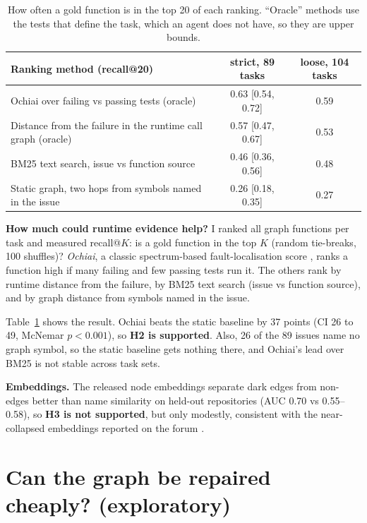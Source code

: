 \documentclass[11pt]{article}
\begin{document}
\begin{table}[t]
\centering\small
\begin{tabular}{lcc}
\toprule
Ranking method (recall@20) & strict, 89 tasks & loose, 104 tasks \\
\midrule
Ochiai over failing vs passing tests (oracle) & 0.63 [0.54, 0.72] & 0.59 \\
Distance from the failure in the runtime call graph (oracle) & 0.57 [0.47, 0.67] & 0.53 \\
BM25 text search, issue vs function source & 0.46 [0.36, 0.56] & 0.48 \\
Static graph, two hops from symbols named in the issue & 0.26 [0.18, 0.35] & 0.27 \\
\bottomrule
\end{tabular}
\caption{How often a gold function is in the top 20 of each ranking. ``Oracle'' methods use the tests that define the task, which an agent does not have, so they are upper bounds.}
\label{tab:rank}
\end{table}

\textbf{How much could runtime evidence help?} I ranked all graph functions per task and measured recall@$K$: is a gold function in the top $K$ (random tie-breaks, 100 shuffles)? \emph{Ochiai}, a classic spectrum-based fault-localisation score \citep{abreu2007ochiai,wong2016survey}, ranks a function high if many failing and few passing tests run it. The others rank by runtime distance from the failure, by BM25 text search (issue vs function source), and by graph distance from symbols named in the issue.

Table~\ref{tab:rank} shows the result. Ochiai beats the static baseline by 37 points (CI 26 to 49, McNemar $p < 0.001$), so \textbf{H2 is supported}. Also, 26 of the 89 issues name no graph symbol, so the static baseline gets nothing there, and Ochiai's lead over BM25 is not stable across task sets.

\textbf{Embeddings.} The released node embeddings separate dark edges from non-edges better than name similarity on held-out repositories (AUC 0.70 vs 0.55--0.58), so \textbf{H3 is not supported}, but only modestly, consistent with the near-collapsed embeddings reported on the forum \citep{forum744040}.

\section{Can the graph be repaired cheaply? (exploratory)}\label{sec:repair}
\end{document}
